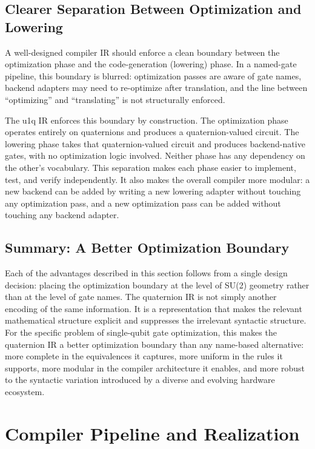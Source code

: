 \documentclass[conference]{IEEEtran}
\begin{document}
\subsection{Clearer Separation Between Optimization and Lowering}

A well-designed compiler IR should enforce a clean boundary between the optimization
phase and the code-generation (lowering) phase. In a named-gate pipeline, this boundary
is blurred: optimization passes are aware of gate names, backend adapters may need to
re-optimize after translation, and the line between ``optimizing'' and ``translating''
is not structurally enforced.

The u1q IR enforces this boundary by construction. The optimization phase operates
entirely on quaternions and produces a quaternion-valued circuit. The lowering phase
takes that quaternion-valued circuit and produces backend-native gates, with no
optimization logic involved. Neither phase has any dependency on the other's vocabulary.
This separation makes each phase easier to implement, test, and verify independently.
It also makes the overall compiler more modular: a new backend can be added by writing
a new lowering adapter without touching any optimization pass, and a new optimization
pass can be added without touching any backend adapter.

\subsection{Summary: A Better Optimization Boundary}

Each of the advantages described in this section follows from a single design decision:
placing the optimization boundary at the level of SU(2) geometry rather than at the level
of gate names. The quaternion IR is not simply another encoding of the same information.
It is a representation that makes the relevant mathematical structure explicit and
suppresses the irrelevant syntactic structure. For the specific problem of single-qubit
gate optimization, this makes the quaternion IR a better optimization boundary than
any name-based alternative: more complete in the equivalences it captures, more uniform
in the rules it supports, more modular in the compiler architecture it enables, and
more robust to the syntactic variation introduced by a diverse and evolving hardware
ecosystem.

\section{Compiler Pipeline and Realization}
\end{document}
